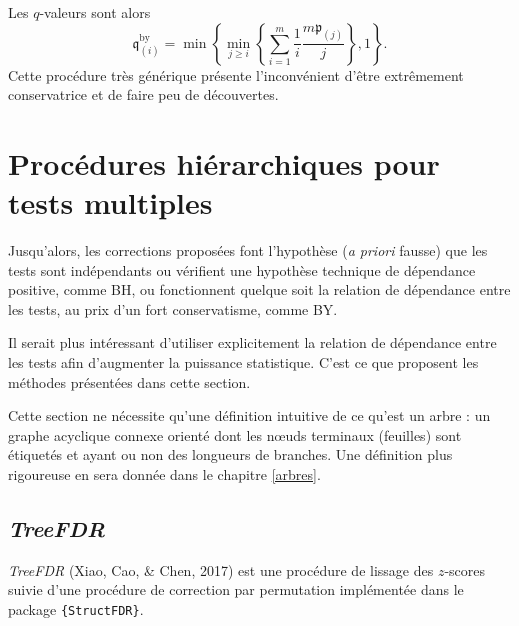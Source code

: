 \documentclass[12pt,a4paper]{reedthesis}
\newcommand \pv {\mathfrak{p}}
\newcommand \qv {\mathfrak{q}}
\theoremstyle{definition}
\theoremstyle{definition}
\theoremstyle{definition}
\theoremstyle{remark}
\begin{document}
Les \(q\)-valeurs sont alors
\begin{equation*}
\qv^{\text{by}}_{(i)} = \min\left\{\min_{j\ge i}\left\{\sum_{i = 1}^m \frac{1}{i} \frac{ m\pv_{(j)}}{j}\right\},1\right\}.
\end{equation*}
Cette procédure très générique présente l'inconvénient d'être extrêmement conservatrice et de faire peu de découvertes.

\hypertarget{procuxe9dures-hiuxe9rarchiques-pour-tests-multiples}{%
\section{Procédures hiérarchiques pour tests multiples}\label{procuxe9dures-hiuxe9rarchiques-pour-tests-multiples}}

Jusqu'alors, les corrections proposées font l'hypothèse (\emph{a priori} fausse) que les tests sont indépendants ou vérifient une hypothèse technique de dépendance positive, comme BH, ou fonctionnent quelque soit la relation de dépendance entre les tests, au prix d'un fort conservatisme, comme BY.

Il serait plus intéressant d'utiliser explicitement la relation de dépendance entre les tests afin d'augmenter la puissance statistique. C'est ce que proposent les méthodes présentées dans cette section.

Cette section ne nécessite qu'une définition intuitive de ce qu'est un arbre : un graphe acyclique connexe orienté dont les nœuds terminaux (feuilles) sont étiquetés et ayant ou non des longueurs de branches. Une définition plus rigoureuse en sera donnée dans le chapitre \ref{arbres}.

\hypertarget{treefdr}{%
\subsection{\texorpdfstring{\emph{TreeFDR}}{TreeFDR}}\label{treefdr}}

\emph{TreeFDR} (Xiao, Cao, \& Chen, 2017) est une procédure de lissage des \(z\)-scores suivie d'une procédure de correction par permutation implémentée dans le package \texttt{\{StructFDR\}}.
\end{document}
